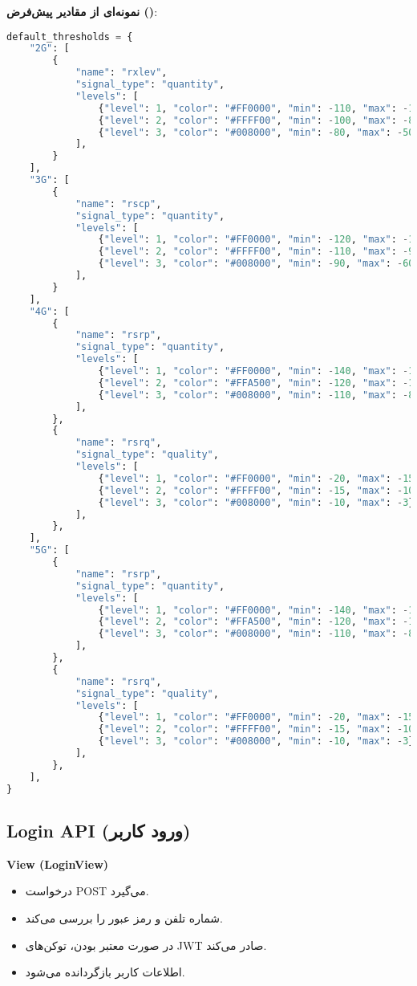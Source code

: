 \documentclass{report}
\begin{document}
\textbf{نمونه‌ای از مقادیر پیش‌فرض ()}:
\begin{lstlisting}[language=python]
default_thresholds = {
    "2G": [
        {
            "name": "rxlev",
            "signal_type": "quantity",
            "levels": [
                {"level": 1, "color": "#FF0000", "min": -110, "max": -100},
                {"level": 2, "color": "#FFFF00", "min": -100, "max": -80},
                {"level": 3, "color": "#008000", "min": -80, "max": -50},
            ],
        }
    ],
    "3G": [
        {
            "name": "rscp",
            "signal_type": "quantity",
            "levels": [
                {"level": 1, "color": "#FF0000", "min": -120, "max": -110},
                {"level": 2, "color": "#FFFF00", "min": -110, "max": -90},
                {"level": 3, "color": "#008000", "min": -90, "max": -60},
            ],
        }
    ],
    "4G": [
        {
            "name": "rsrp",
            "signal_type": "quantity",
            "levels": [
                {"level": 1, "color": "#FF0000", "min": -140, "max": -120},
                {"level": 2, "color": "#FFA500", "min": -120, "max": -110},
                {"level": 3, "color": "#008000", "min": -110, "max": -80},
            ],
        },
        {
            "name": "rsrq",
            "signal_type": "quality",
            "levels": [
                {"level": 1, "color": "#FF0000", "min": -20, "max": -15},
                {"level": 2, "color": "#FFFF00", "min": -15, "max": -10},
                {"level": 3, "color": "#008000", "min": -10, "max": -3},
            ],
        },
    ],
    "5G": [
        {
            "name": "rsrp",
            "signal_type": "quantity",
            "levels": [
                {"level": 1, "color": "#FF0000", "min": -140, "max": -120},
                {"level": 2, "color": "#FFA500", "min": -120, "max": -110},
                {"level": 3, "color": "#008000", "min": -110, "max": -80},
            ],
        },
        {
            "name": "rsrq",
            "signal_type": "quality",
            "levels": [
                {"level": 1, "color": "#FF0000", "min": -20, "max": -15},
                {"level": 2, "color": "#FFFF00", "min": -15, "max": -10},
                {"level": 3, "color": "#008000", "min": -10, "max": -3},
            ],
        },
    ],
}
\end{lstlisting}


\subsection{Login API (ورود کاربر)}
\textbf{View (LoginView)} \\
\begin{itemize}
  \item درخواست POST می‌گیرد.
  \item شماره تلفن و رمز عبور را بررسی می‌کند.
  \item در صورت معتبر بودن، توکن‌های JWT صادر می‌کند.
  \item اطلاعات کاربر بازگردانده می‌شود.
\end{itemize}
\end{document}
